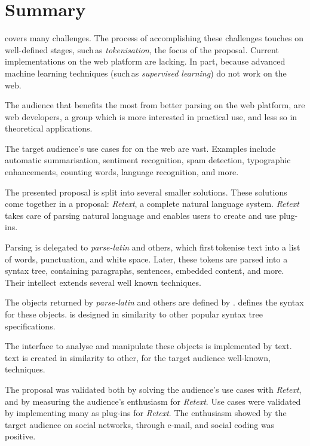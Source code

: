 \begingroup
\let\cleardoublepage\relax
\let\cleardoublepage\relax

\pagebreak

\section*{Summary}

 covers many challenges.
The process of accomplishing these challenges touches on well-defined stages,
  such\,as \emph{tokenisation}, the focus of the proposal.
Current implementations on the web platform are lacking.
In part, because advanced machine learning techniques (such\,as
  \emph{supervised learning}) do not work on the web.

The audience that benefits the most from better parsing on the web platform,
  are web developers, a group which is more interested in practical use, and
  less so in theoretical applications.

The target audience's use cases for  on the web are
  vast.
Examples include automatic summarisation, sentiment recognition, spam
  detection, typographic enhancements, counting words, language recognition,
  and more.

The presented proposal is split into several smaller solutions.
These solutions come together in a proposal: \emph{Retext}, a complete
  natural language system.
\emph{Retext} takes care of parsing natural language and enables users to
  create and use plug-ins.

Parsing is delegated to \emph{parse-latin} and others, which first\,tokenise
  text into a list of words, punctuation, and white space.
Later, these tokens are parsed into a syntax tree, containing paragraphs,
  sentences, embedded content, and more. Their intellect extends several well
  known techniques.

The objects returned by \emph{parse-latin} and others are defined by
  .
 defines the syntax for these objects.
 is designed in similarity to other popular syntax
  tree specifications.

The interface to analyse and manipulate these objects is implemented by
  text.
text is created in similarity to other, for the
  target audience well-known, techniques.

The proposal was validated both by solving the audience's use cases with
  \emph{Retext}, and by measuring the audience's enthusiasm for \emph{Retext}.
Use cases were validated by implementing many as plug-ins for
  \emph{Retext}.
The enthusiasm showed by the target audience on social networks, through
  e-mail, and social coding was positive.

\endgroup